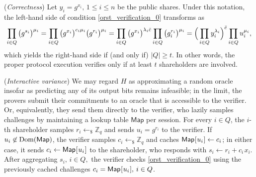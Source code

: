 \documentclass{iacrtrans}
\begin{document}
\begin{rem}\label{orst_correctness}
(\textit{Correctness})
Let $y_i = g ^ {x_i},\hspace{2pt} 1 \le i \le n$
be the public shares.
Under this notation,
the left-hand side of condition \eqref{orst_verification_0}
transforms as
\vspace{5pt}
\begin{equation*}
\prod_{i \in Q} \big(g ^ {s_i }\big) ^ {\mu_i} =
\prod_{i \in Q} \big(g ^ {x_i}\big) ^ {c_i \mu_i} \big(g ^ {r_i}\big) ^ {\mu_i} =
\prod_{i \in Q} \big(g ^ {x_i}\big) ^ {\lambda_i \bar{c}} \prod_{i \in Q} \big(g_i ^ {r_i}\big) ^ {\mu_i} =
\Big(\prod_{i \in Q} y_i ^ {\lambda_i}\Big) ^ {\bar{c}} \prod_{i \in Q} u_i ^ {\mu_i},
\vspace{5pt}
\end{equation*}
which yields the right-hand side if (and only if) $|Q| \ge t$.
In other words, the proper protocol execution verifies
only if at least $t$ shareholders are involved.
\end{rem}

\begin{rem}\label{orst_interactive}
(\textit{Interactive variance})
We may regard $H$ as approximating
a random oracle insofar as predicting any of its output bits
remains infeasible; in the limit,
the provers submit their commitments
to an oracle that is accessible to the verifier.
Or, equivalently, they send them
directly to the verifier, who lazily samples challenges
by maintaining a lookup table $\mathsf{Map}$ per session.
For every $i \in Q$, the $i$-th shareholder
samples $r_i \leftarrow_\$ \mathbb{Z}_q$
and sends
$u_i = g ^ {r_i}$ to the verifier.
If $u_i \not \in \textup{Dom}(\mathsf{Map})$,
the verifier samples
$c_i \leftarrow_\$ \mathbb{Z}_q$
and caches
$\mathsf{Map}\hspace{0.5pt}
[\hspace{0.5pt}u_i\hspace{0.5pt}]\leftarrow c_i$;
in either case, it sends %
$c_i \leftarrow \mathsf{Map}\hspace{0.5pt}
[\hspace{0.5pt}u_i\hspace{0.5pt}]$
to the shareholder, who responds with
$s_i \leftarrow r_i + c_i\hspace{1pt}x_i$.
After aggregating
$s_i,\hspace{2pt} i \in Q,$
the verifier checks
\eqref{orst_verification_0} using
the previously cached challenges
$c_i = \mathsf{Map}\hspace{0.5pt}
[\hspace{0.5pt}u_i\hspace{0.5pt}],\hspace{2pt} i \in Q$.
\end{rem}
\end{document}
